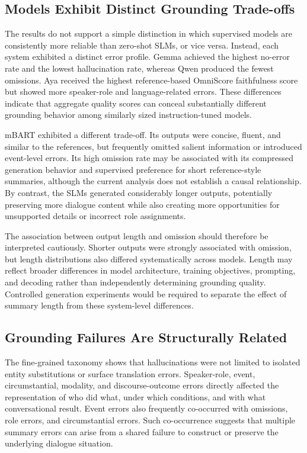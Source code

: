\documentclass[11pt]{article}
\begin{document}
\subsection{Models Exhibit Distinct Grounding Trade-offs}

The results do not support a simple distinction in which supervised models are consistently more reliable than zero-shot SLMs, or vice versa. Instead, each system exhibited a distinct error profile. Gemma achieved the highest no-error rate and the lowest hallucination rate, whereas Qwen produced the fewest omissions. Aya received the highest reference-based OmniScore faithfulness score but showed more speaker-role and language-related errors. These differences indicate that aggregate quality scores can conceal substantially different grounding behavior among similarly sized instruction-tuned models.

mBART exhibited a different trade-off. Its outputs were concise, fluent, and similar to the references, but frequently omitted salient information or introduced event-level errors. Its high omission rate may be associated with its compressed generation behavior and supervised preference for short reference-style summaries, although the current analysis does not establish a causal relationship. By contrast, the SLMs generated considerably longer outputs, potentially preserving more dialogue content while also creating more opportunities for unsupported details or incorrect role assignments.

The association between output length and omission should therefore be interpreted cautiously. Shorter outputs were strongly associated with omission, but length distributions also differed systematically across models. Length may reflect broader differences in model architecture, training objectives, prompting, and decoding rather than independently determining grounding quality. Controlled generation experiments would be required to separate the effect of summary length from these system-level differences.

\subsection{Grounding Failures Are Structurally Related}

The fine-grained taxonomy shows that hallucinations were not limited to isolated entity substitutions or surface translation errors. Speaker-role, event, circumstantial, modality, and discourse-outcome errors directly affected the representation of who did what, under which conditions, and with what conversational result. Event errors also frequently co-occurred with omissions, role errors, and circumstantial errors. Such co-occurrence suggests that multiple summary errors can arise from a shared failure to construct or preserve the underlying dialogue situation.
\end{document}
